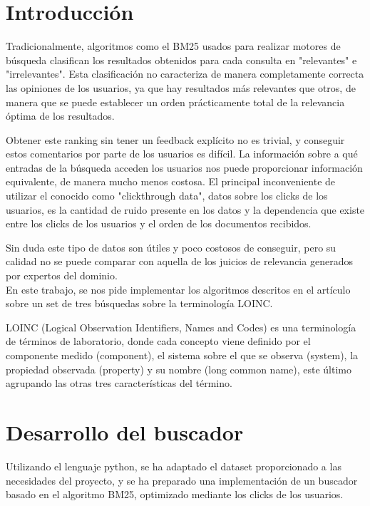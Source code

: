 \documentclass[a4paper,12pt]{article}
\begin{document}
	
	\setlength{\parindent}{0.5cm}
	\setlength{\voffset}{-2cm}
	\setlength{\hoffset}{-2cm}
	
	
	

	
	\section{Introducción}
	Tradicionalmente, algoritmos como el BM25 usados para realizar motores de búsqueda clasifican los resultados obtenidos para cada consulta en "relevantes" e "irrelevantes". Esta clasificación no caracteriza de manera completamente correcta las opiniones de los usuarios, ya que hay resultados más relevantes que otros, de manera que se puede establecer un orden prácticamente total de la relevancia óptima de los resultados. 
	
	Obtener este ranking sin tener un feedback explícito no es trivial, y conseguir estos comentarios por parte de los usuarios es difícil. La información sobre a qué entradas de la búsqueda acceden los usuarios nos puede proporcionar información equivalente, de manera mucho menos costosa. El principal inconveniente de utilizar el conocido como "clickthrough data", datos sobre los clicks de los usuarios, es la cantidad de ruido presente en los datos y la dependencia que existe entre los clicks de los usuarios y el orden de los documentos recibidos.
	
	Sin duda este tipo de datos son útiles y poco costosos de conseguir, pero su calidad no se puede comparar con aquella de los juicios de relevancia generados por expertos del dominio.\\
	
	En este trabajo, se nos pide implementar los algoritmos descritos en el artículo \cite{articulo-clase} sobre un set de tres búsquedas sobre la terminología LOINC.
	
	LOINC (Logical Observation Identifiers, Names and Codes)\cite{loinc} es una terminología de términos de laboratorio, donde cada concepto viene definido por el componente medido (component), el sistema sobre el que se observa (system), la propiedad observada (property) y su nombre (long common name), este último agrupando las otras tres características del término.
	
	\section{Desarrollo del buscador}
	Utilizando el lenguaje python, se ha adaptado el dataset proporcionado a las necesidades del proyecto, y se ha preparado una implementación de un buscador basado en el algoritmo BM25, optimizado mediante los clicks de los usuarios.
	
\end{document}
